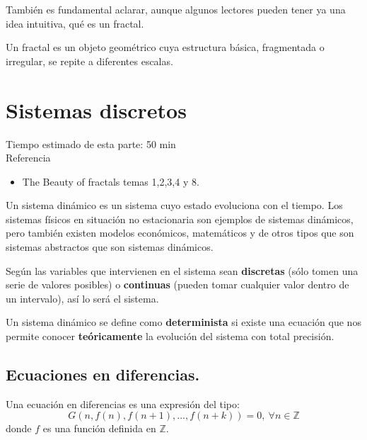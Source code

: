 También es fundamental aclarar, aunque algunos lectores pueden tener ya una idea intuitiva, qué es un fractal.

\begin{definition}[Fractal]
Un fractal es un objeto geométrico cuya estructura básica, fragmentada o irregular, se repite a diferentes escalas.
\end{definition}

\section{Sistemas discretos}
Tiempo estimado de esta parte: 50 min\\
Referencia
\begin{itemize}
\item The Beauty of fractals temas 1,2,3,4 y 8.
\end{itemize}

\begin{definition}\label{def:sistemaDinamico}
Un sistema dinámico es un sistema cuyo estado evoluciona con el tiempo. Los sistemas físicos en situación no estacionaria son ejemplos de sistemas dinámicos, pero también existen modelos económicos, matemáticos y de otros tipos que son sistemas abstractos que son sistemas dinámicos.

Según las variables que intervienen en el sistema sean \textbf{discretas} (sólo tomen una serie de valores posibles) o \textbf{continuas} (pueden tomar cualquier valor dentro de un intervalo), así lo será el sistema.
\end{definition}

Un sistema dinámico se define como \textbf{determinista} si existe una ecuación que nos permite conocer \textbf{teóricamente} la evolución del sistema con total precisión.


\subsection{Ecuaciones en diferencias.}

\begin{definition}
Una ecuación en diferencias es una expresión del tipo:
\[G(n,f(n),f(n+1),...,f(n+k))=0, \ \forall n \in \mathbb{Z}\]
donde $f$ es una función definida en $\mathbb{Z}$.
\end{definition}

